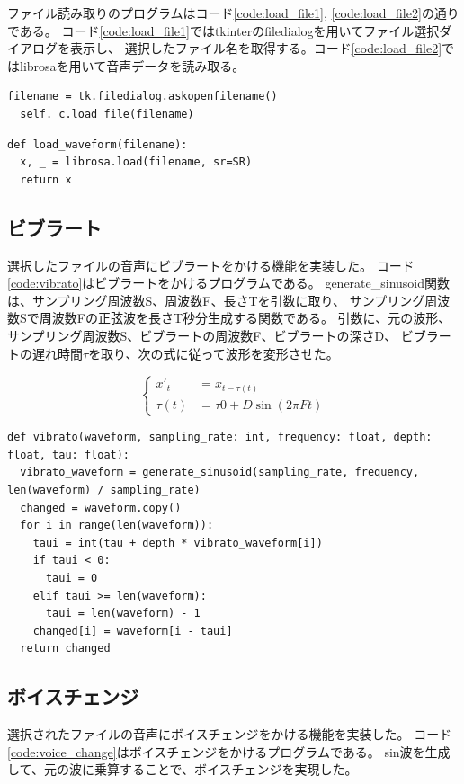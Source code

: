 \documentclass[a4paper,11pt]{jsarticle}
\begin{document}
ファイル読み取りのプログラムはコード\ref{code:load_file1}, \ref{code:load_file2}の通りである。
コード\ref{code:load_file1}ではtkinterのfiledialogを用いてファイル選択ダイアログを表示し、
選択したファイル名を取得する。コード\ref{code:load_file2}ではlibrosaを用いて音声データを読み取る。

\begin{lstlisting}[caption=ファイル読み取り1,label=code:load_file1]
  filename = tk.filedialog.askopenfilename()
  self._c.load_file(filename)
\end{lstlisting}

\begin{lstlisting}[caption=ファイル読み取り2,label=code:load_file2]
def load_waveform(filename):
  x, _ = librosa.load(filename, sr=SR)
  return x
\end{lstlisting}

\subsection{ビブラート}
選択したファイルの音声にビブラートをかける機能を実装した。
コード\ref{code:vibrato}はビブラートをかけるプログラムである。
generate\_sinusoid関数は、サンプリング周波数S、周波数F、長さTを引数に取り、
サンプリング周波数Sで周波数Fの正弦波を長さT秒分生成する関数である。
引数に、元の波形、サンプリング周波数S、ビブラートの周波数F、ビブラートの深さD、
ビブラートの遅れ時間$\tau$を取り、次の式に従って波形を変形させた。

\begin{equation}
  \left\{
  \begin{aligned}
    x'_t &= x_{t-\tau(t)} \\
    \tau(t) &= \tau 0 + D \sin(2 \pi F t)
  \end{aligned}
  \right.
\end{equation}

\begin{lstlisting}[caption=ビブラート,label=code:vibrato]
def vibrato(waveform, sampling_rate: int, frequency: float, depth: float, tau: float):
  vibrato_waveform = generate_sinusoid(sampling_rate, frequency, len(waveform) / sampling_rate)
  changed = waveform.copy()
  for i in range(len(waveform)):
    taui = int(tau + depth * vibrato_waveform[i])
    if taui < 0:
      taui = 0
    elif taui >= len(waveform):
      taui = len(waveform) - 1
    changed[i] = waveform[i - taui]
  return changed
\end{lstlisting}

\subsection{ボイスチェンジ}
選択されたファイルの音声にボイスチェンジをかける機能を実装した。
コード\ref{code:voice_change}はボイスチェンジをかけるプログラムである。
sin波を生成して、元の波に乗算することで、ボイスチェンジを実現した。
\end{document}
